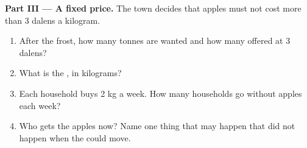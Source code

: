 \begin{problem}
\medskip
\noindent\textbf{Part III --- A fixed price.} The town decides that apples must not cost more
than 3 dalens a kilogram.
\begin{enumerate}[resume]
  \item After the frost, how many tonnes are wanted and how many offered at 3 dalens?
  \item What is the , in kilograms?
  \item Each household buys 2 kg a week. How many households go without apples each week?
  \item Who gets the apples now? Name one thing that may happen that did not happen when the
         could move.
\end{enumerate}
\end{problem}
